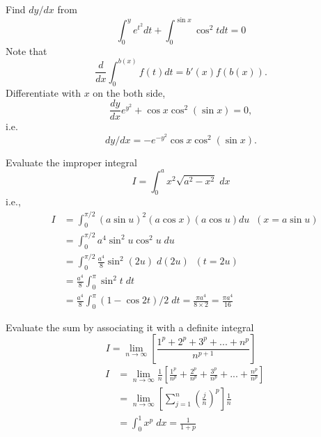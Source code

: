 \documentclass{article}
\begin{document}
  Find $dy/dx$ from
$$
\int_0^y e^{t^2} d t + \int_0^{\sin x } \cos ^2 t d t=0
$$
Note that
$$
\frac{ d}{ dx} \int_0^{b(x)} f(t) d t =b'(x)f(b(x)).
$$
Differentiate with $x$ on the both side,
$$
\frac{ d y}{ dx}  e^{y^2}+ \cos x \cos^2 (\sin x)=0,
$$
i.e.
$$
dy/dx =- e^{-y^2} \cos x \cos^2 (\sin x).
$$

\vspace{0.2in}



 Evaluate  the improper integral
$$
I=\int_0^{a} x^2 \sqrt{ a^2 - x^2 }  \;   dx
$$
i.e.,
\begin{eqnarray}
& I & =\int_{0}^{\pi/2}  (a \sin u)^2 (a \cos x) (a \cos u) du \; \; (x=a \sin u)  \nonumber\\
&   & = \int_{0}^{\pi/2}  a^4 \sin^2 u  \cos^2 u \;  du          \; \;  \nonumber\\
&   & =  \int_{0}^{\pi/2}  \frac{a^4}{8} \sin^2 (2 u)  \;  d( 2 u)          \; \; (t=2u) \nonumber\\
&   & =  \frac{a^4}{8} \int_{0}^{\pi}  \sin^2 t  \;  d t          \; \;  \nonumber\\
&   & =  \frac{a^4}{8} \int_{0}^{\pi} (1- \cos 2 t)/2  \;  d t =
\frac{\pi a^4 }{8 \times 2} = \frac{\pi a^4  }{16}\; \; \nonumber
\end{eqnarray}



\vspace{0.2in}



 Evaluate the sum by associating
it with a definite integral
$$
I = \lim_{n \to \infty} \left[ \frac{1^p+2^p+
3^p+...+n^p}{n^{p+1}}  \right]
$$
\begin{eqnarray}
& I & = \lim_{n \to \infty}  \frac{1}{n} \left[   \frac{1^p}{n^p}
+ \frac{2^p}{n^p}+ \frac{3^p}{n^p}+...+ \frac{n^p}{n^p}
\right]     \nonumber\\
&   & = \lim_{n \to \infty} \left[ \sum_{j=1}^{n}
\left( \frac{j}{n}\right)^p \right]  \frac{1}{n}   \nonumber\\
&   & = \int_0^{1} x^p \; dx = \frac{1}{1+p} \nonumber
\end{eqnarray}


\newpage

\vspace{0.2in}
\end{document}
